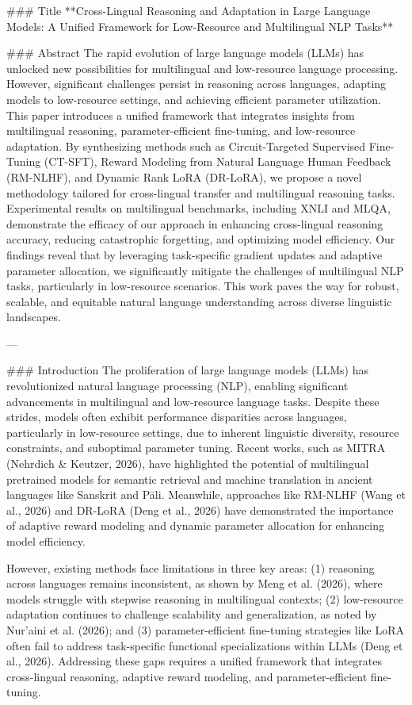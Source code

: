### Title
**Cross-Lingual Reasoning and Adaptation in Large Language Models: A Unified Framework for Low-Resource and Multilingual NLP Tasks**

### Abstract
The rapid evolution of large language models (LLMs) has unlocked new possibilities for multilingual and low-resource language processing. However, significant challenges persist in reasoning across languages, adapting models to low-resource settings, and achieving efficient parameter utilization. This paper introduces a unified framework that integrates insights from multilingual reasoning, parameter-efficient fine-tuning, and low-resource adaptation. By synthesizing methods such as Circuit-Targeted Supervised Fine-Tuning (CT-SFT), Reward Modeling from Natural Language Human Feedback (RM-NLHF), and Dynamic Rank LoRA (DR-LoRA), we propose a novel methodology tailored for cross-lingual transfer and multilingual reasoning tasks. Experimental results on multilingual benchmarks, including XNLI and MLQA, demonstrate the efficacy of our approach in enhancing cross-lingual reasoning accuracy, reducing catastrophic forgetting, and optimizing model efficiency. Our findings reveal that by leveraging task-specific gradient updates and adaptive parameter allocation, we significantly mitigate the challenges of multilingual NLP tasks, particularly in low-resource scenarios. This work paves the way for robust, scalable, and equitable natural language understanding across diverse linguistic landscapes.

---

### Introduction
The proliferation of large language models (LLMs) has revolutionized natural language processing (NLP), enabling significant advancements in multilingual and low-resource language tasks. Despite these strides, models often exhibit performance disparities across languages, particularly in low-resource settings, due to inherent linguistic diversity, resource constraints, and suboptimal parameter tuning. Recent works, such as MITRA (Nehrdich & Keutzer, 2026), have highlighted the potential of multilingual pretrained models for semantic retrieval and machine translation in ancient languages like Sanskrit and Pāli. Meanwhile, approaches like RM-NLHF (Wang et al., 2026) and DR-LoRA (Deng et al., 2026) have demonstrated the importance of adaptive reward modeling and dynamic parameter allocation for enhancing model efficiency.

However, existing methods face limitations in three key areas: (1) reasoning across languages remains inconsistent, as shown by Meng et al. (2026), where models struggle with stepwise reasoning in multilingual contexts; (2) low-resource adaptation continues to challenge scalability and generalization, as noted by Nur’aini et al. (2026); and (3) parameter-efficient fine-tuning strategies like LoRA often fail to address task-specific functional specializations within LLMs (Deng et al., 2026). Addressing these gaps requires a unified framework that integrates cross-lingual reasoning, adaptive reward modeling, and parameter-efficient fine-tuning.

